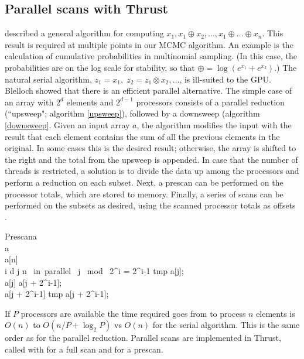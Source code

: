\subsection{Parallel scans with Thrust}
\citet{blelloch1990} described a general algorithm for computing $x_1,
x_1 \oplus x_2, \ldots, x_1 \oplus \ldots \oplus x_n$. This result is required at multiple points in our MCMC algorithm. An example is the calculation of cumulative probabilities in multinomial sampling. (In this case, the probabilities are on the log scale for stability, so that $\oplus=\log(e^{x_1}+e^{x_2})$.) The natural serial algorithm, $z_1 = x_1,\;z_2 = z_1 \otimes x_2,\dots$, is ill-suited to the GPU. Blelloch showed that there is an efficient parallel alternative. The simple case of an array with $2^d$ elements and $2^{d-1}$ processors consists of a parallel reduction (``upsweep"; algorithm \ref{upsweep}), followed by a downsweep (algorithm \ref{downsweep}. Given an input array $a$, the algorithm modifies the input with the result that each element contains the sum of all the previous elements in the original. In some cases this is the desired result; otherwise, the array is shifted to the right and the total from the upsweep is appended. In case that the number of threads is restricted, a solution is to divide the data up among the processors and perform a reduction on each subset. Next, a prescan can be performed on the processor totals, which are stored to memory. Finally, a series of scans can be performed on the subsets as desired, using the scanned processor totals as offsets \cite{blelloch1990}.
\begin{pseudocode}[ruled]{Prescan}{a}
\label{downsweep}
\\
a \GETS {}\\
a[n] \\
\FOR i \GETS d  \DO \BEGIN
  \FOR j  \TO n \mbox{ in parallel }\DO \BEGIN
    \IF j \mbox{ mod } 2^i = 2^{i-1} \DO \BEGIN
    tmp \GETS a[j];\\
    a[j] \GETS a[j + 2^{i-1}];\\
    a[j + 2^{i-1}] \GETS tmp \oplus a[j + 2^{i-1}];
    \END \END \END
{}
\end{pseudocode}


If $P$ processors are available
the time required goes from to process $n$ elements is $O(n)$ to $O(n/P + \log_2P)$ vs $O(n)$ for the serial algorithm. This is the same order as for the parallel reduction. Parallel scans are implemented in Thrust, called with  for a full scan and  for a prescan.



